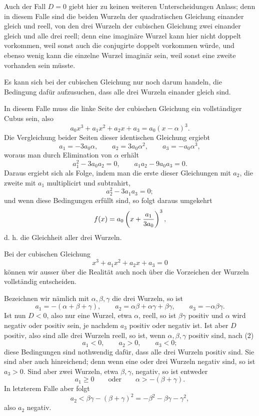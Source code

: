 \documentclass[11pt]{article}
\begin{document}
Auch der Fall $D=0$ giebt hier zu keinen weiteren Unterscheidungen Anlass; denn in diesem Falle sind die beiden Wurzeln der quadratischen Gleichung einander gleich und reell, von den drei Wurzeln der cubischen Gleichung zwei einander gleich und alle drei reell; denn eine imagin\"are Wurzel kann hier nicht doppelt vorkommen, weil sonst auch die conjugirte doppelt vorkommen w\"urde, und ebenso wenig kann die einzelne Wurzel imagin\"ar sein, weil sonst eine zweite vorhanden sein m\"usste.

Es kann sich bei der cubischen Gleichung nur noch darum handeln, die Bedingung daf\"ur aufzusuchen, dass alle drei Wurzeln einander gleich sind.

In diesem Falle muss die linke Seite der cubischen Gleichung ein vollst\"andiger Cubus sein, also
\[
        a_0x^3+a_1x^2+a_2x+a_3=a_0(x-\alpha)^3.
\]
Die Vergleichung beider Seiten dieser identischen Gleichung ergiebt
\[
        a_1=-3a_0\alpha,\qquad a_2=3a_0\alpha^2,\qquad a_3=-a_0\alpha^3,
\]
woraus man durch Elimination von $\alpha$ erh\"alt
\begin{equation}
        a_1^2-3a_0a_2=0,\qquad a_1a_2-9a_0a_3=0.
\tag{1}
\end{equation}
Daraus ergiebt sich als Folge, indem man die erste dieser Gleichungen mit $a_2$, die zweite mit $a_1$ multiplicirt und subtrahirt,
\[
        a_2^2-3a_1a_3=0;
\]
und wenn diese Bedingungen erf\"ullt sind, so folgt daraus umgekehrt
\[
        f(x)=a_0\left(x+{a_1\over 3a_0}\right)^3,
\]
d. h. die Gleichheit aller drei Wurzeln.

Bei der cubischen Gleichung
\[
        x^3+a_1x^2+a_2x+a_3=0
\]
k\"onnen wir ausser \"uber die Realit\"at auch noch \"uber die Vorzeichen der Wurzeln vollst\"andig entscheiden.

Bezeichnen wir n\"amlich mit $\alpha,\beta,\gamma$ die drei Wurzeln, so ist
\begin{equation}
        a_1=-(\alpha+\beta+\gamma),\qquad
        a_2=\alpha\beta+\alpha\gamma+\beta\gamma,\qquad
        a_3=-\alpha\beta\gamma.
\tag{2}
\end{equation}
Ist nun $D<0$, also nur eine Wurzel, etwa $\alpha$, reell, so ist $\beta\gamma$ positiv und $\alpha$ wird negativ oder positiv sein, je nachdem $a_3$ positiv oder negativ ist. Ist aber $D$ positiv, also sind alle drei Wurzeln reell, so ist, wenn $\alpha,\beta,\gamma$ positiv sind, nach (2)
\begin{equation}
        a_1<0,
        \qquad a_2>0,
        \qquad a_3<0;
\tag{3}
\end{equation}
diese Bedingungen sind nothwendig daf\"ur, dass alle drei Wurzeln positiv sind. Sie sind aber auch hinreichend; denn wenn eine oder drei Wurzeln negativ sind, so ist $a_3>0$. Sind aber zwei Wurzeln, etwa $\beta,\gamma$, negativ, so ist entweder
\[
        a_1\geq 0 \qquad\text{oder}\qquad \alpha>-(\beta+\gamma).
\]
In letzterem Falle aber folgt
\[
        a_2<\beta\gamma-(\beta+\gamma)^2=-\beta^2-\beta\gamma-\gamma^2,
\]
also $a_2$ negativ.
\end{document}
